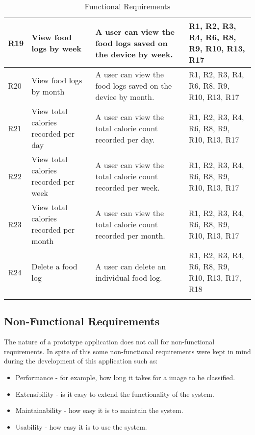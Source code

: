 \begin{longtable}{|p{.75cm}|p{3.5cm}|p{6cm}|p{2.5cm}|}
R19         & View food logs by week                                      & A user can view the food logs saved on the device by week.                                              & R1, R2, R3, R4, R6, R8, R9, R10, R13, R17      \\ \hline
R20         & View food logs by month                                     & A user can view the food logs saved on the device by month.                                             & R1, R2, R3, R4, R6, R8, R9, R10, R13, R17      \\ \hline
R21         & View total calories recorded per day                        & A user can view the total calorie count recorded per day.                                               & R1, R2, R3, R4, R6, R8, R9, R10, R13, R17      \\ \hline
R22         & View total calories recorded per week                       & A user can view the total calorie count recorded per week.                                              & R1, R2, R3, R4, R6, R8, R9, R10, R13, R17      \\ \hline
R23         & View total calories recorded per month                      & A user can view the total calorie count recorded per month.                                             & R1, R2, R3, R4, R6, R8, R9, R10, R13, R17      \\ \hline
R24         & Delete a food log                                           & A user can delete an individual food log.                                                               & R1, R2, R3, R4, R6, R8, R9, R10, R13, R17, R18 \\ \hline
\caption{Functional Requirements}
\label{requirements}
\end{longtable}

\subsection*{Non-Functional Requirements}
The nature of a prototype application does not call for non-functional requirements.
In spite of this some non-functional requirements were kept in mind during the development of this application such as:
\begin{itemize}
	\item{Performance - for example, how long it takes for a image to be classified.}
	\item{Extensibility - is it easy to extend the functionality of the system.}
	\item{Maintainability - how easy it is to maintain the system.}
	\item{Usability - how easy it is to use the system.}
\end{itemize}

\clearpage